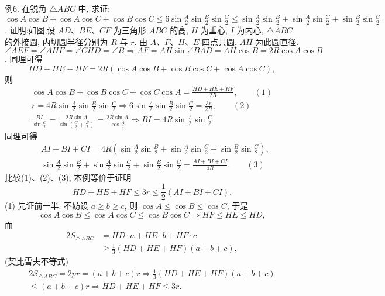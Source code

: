 例6. 在锐角 $\triangle A B C$ 中, 求证: $\cos A \cos B+ \cos A \cos C+\cos B \cos C \leqslant 6 \sin \frac{A}{2} \sin \frac{B}{2} \sin \frac{C}{2} \leqslant \sin \frac{A}{2} \sin \frac{B}{2}+\sin \frac{A}{2} \sin \frac{C}{2}+\sin \frac{B}{2} \sin \frac{C}{2}$.
证明:如图,设 $A D 、 B E 、 C F$ 为三角形 $A B C$ 的高, $H$ 为垂心, $I$ 为内心, $\triangle A B C$ 的外接圆, 内切圆半径分别为 $R$ 与 $r$.
由 $A 、 F 、 H 、 E$ 四点共圆, $A H$ 为此圆直径.
$\angle A E F=\angle A H F= \angle C H D=\angle B \Rightarrow A F=A H \sin \angle B A D=A H \cos B=2 R \cos A \cos B$.
同理可得
$$
H D+H E+H F=2 R(\cos A \cos B+\cos B \cos C+\cos A \cos C),
$$
则
$$
\begin{gathered}
\cos A \cos B+\cos B \cos C+\cos C \cos A=\frac{H D+H E+H F}{2 R}, \quad\quad(1) \\
r=4 R \sin \frac{A}{2} \sin \frac{B}{2} \sin \frac{C}{2} \Rightarrow 6 \sin \frac{A}{2} \sin \frac{B}{2} \sin \frac{C}{2}=\frac{3 r}{2 R}, \quad\quad(2) \\
\frac{B I}{\sin \frac{C}{2}}=\frac{2 R \sin A}{\sin \left(\frac{C}{2}+\frac{B}{2}\right)}=\frac{2 R \sin A}{\cos \frac{A}{2}} \Rightarrow B I=4 R \sin \frac{A}{2} \sin \frac{C}{2}
\end{gathered}
$$
同理可得
$$
\begin{aligned}
& A I+B I+C I=4 R\left(\sin \frac{A}{2} \sin \frac{B}{2}+\sin \frac{A}{2} \sin \frac{C}{2}+\sin \frac{B}{2} \sin \frac{C}{2}\right), \\
& \sin \frac{A}{2} \sin \frac{B}{2}+\sin \frac{A}{2} \sin \frac{C}{2}+\sin \frac{B}{2} \sin \frac{C}{2}=\frac{A I+B I+C I}{4 R} .\quad\quad(3)
\end{aligned}
$$
比较(1)、(2)、(3), 本例等价于证明
$$
H D+H E+H F \leqslant 3 r \leqslant \frac{1}{2}(A I+B I+C I) .
$$
(1) 先证前一半.
不妨设 $a \geqslant b \geqslant c$, 则 $\cos A \leqslant \cos B \leqslant \cos C$, 于是
$$
\cos A \cos B \leqslant \cos A \cos C \leqslant \cos B \cos C \Rightarrow H F \leqslant H E \leqslant H D,
$$
而
$$
\begin{aligned}
2 S_{\triangle A B C} & =H D \cdot a+H E \cdot b+H F \cdot c \\
& \geqslant \frac{1}{3}(H D+H E+H F)(a+b+c),
\end{aligned}
$$
 (契比雪夫不等式)
$$
\begin{gathered}
2 S_{\triangle A B C}=2 p r=(a+b+c) r \Rightarrow \frac{1}{3}(H D+H E+H F)(a+b+c) \\
\leqslant(a+b+c) r \Rightarrow H D+H E+H F \leqslant 3 r .
\end{gathered}
$$
